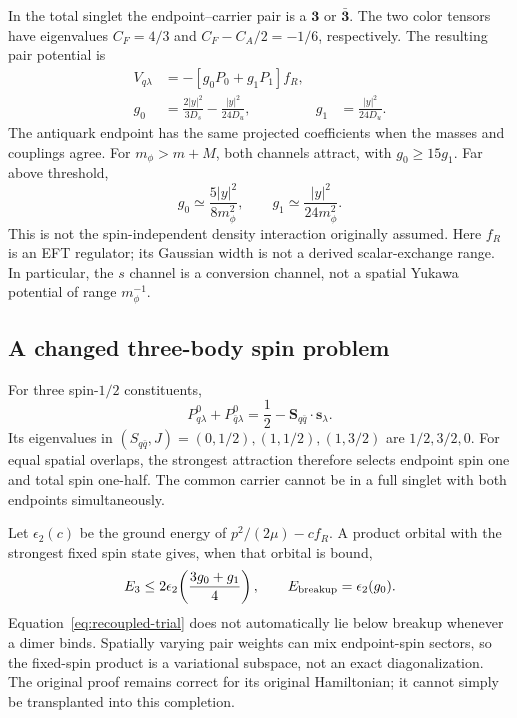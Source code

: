 In the total singlet the endpoint--carrier pair is a $\mathbf3$ or $\bar{\mathbf3}$. The two color tensors have eigenvalues $C_F=4/3$ and $C_F-C_A/2=-1/6$, respectively. The resulting pair potential is
\begin{align}
 V_{q\lambda}&=-[g_0P_0+g_1P_1]f_R,\\
 g_0&=\frac{2|y|^2}{3D_s}-\frac{|y|^2}{24D_u},
 &g_1&=\frac{|y|^2}{24D_u}.
 \label{eq:matched-contact}
\end{align}
The antiquark endpoint has the same projected coefficients when the masses and couplings agree. For $m_\phi>m+M$, both channels attract, with $g_0\geq15g_1$. Far above threshold,
\begin{equation}
 g_0\simeq\frac{5|y|^2}{8m_\phi^2},\qquad
 g_1\simeq\frac{|y|^2}{24m_\phi^2}.
\end{equation}
This is not the spin-independent density interaction originally assumed. Here $f_R$ is an EFT regulator; its Gaussian width is not a derived scalar-exchange range. In particular, the $s$ channel is a conversion channel, not a spatial Yukawa potential of range $m_\phi^{-1}$.

\subsection{A changed three-body spin problem}
For three spin-$1/2$ constituents,
\begin{equation}
 P^0_{q\lambda}+P^0_{\bar q\lambda}
 =\frac12-\mathbf S_{q\bar q}\cdot\mathbf s_\lambda.
\end{equation}
Its eigenvalues in $(S_{q\bar q},J)=(0,1/2),(1,1/2),(1,3/2)$ are $1/2,3/2,0$. For equal spatial overlaps, the strongest attraction therefore selects endpoint spin one and total spin one-half. The common carrier cannot be in a full singlet with both endpoints simultaneously.

Let $\epsilon_2(c)$ be the ground energy of $p^2/(2\mu)-c f_R$. A product orbital with the strongest fixed spin state gives, when that orbital is bound,
\begin{equation}
 E_3\leq2\epsilon_2\!\left(\frac{3g_0+g_1}{4}\right),
 \qquad E_{\rm breakup}=\epsilon_2(g_0).
 \label{eq:recoupled-trial}
\end{equation}
Equation~\eqref{eq:recoupled-trial} does not automatically lie below breakup whenever a dimer binds. Spatially varying pair weights can mix endpoint-spin sectors, so the fixed-spin product is a variational subspace, not an exact diagonalization. The original proof remains correct for its original Hamiltonian; it cannot simply be transplanted into this completion.

